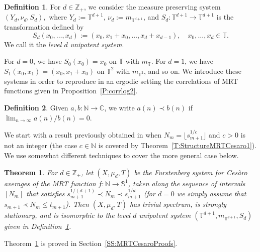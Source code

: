 \documentclass[11pt]{amsart}
\newtheorem{theorem}[lemma]{Theorem}
\theoremstyle{definition}
\newtheorem{definition}{Definition}[section]
\newcommand{\C}{{\mathbb C}}
\newcommand{\N}{{\mathbb N}}
\renewcommand{\S}{\mathbb{S}}
\newcommand{\T}{{\mathbb T}}
\newcommand{\Z}{{\mathbb Z}}
\begin{document}
 \begin{definition}\label{D:Sk}
	For  $d\in \Z_+$, we consider the measure preserving system
	$
	(Y_d,\nu_d,S_d),
	$
	where  $Y_d:=\T^{d+1}$, $\nu_d:=m_{\T^{d+1}}$,  and  $S_d\colon \T^{d+1}\to \T^{d+1}$ is the transformation defined by
	$$
	S_d(x_0,\ldots, x_d):=(x_0,x_1+x_0,\ldots, x_d+x_{d-1}), \quad x_0,\ldots, x_d\in \T.
	$$
	We call it the {\em level $d$ unipotent system}.
	\end{definition}
For $d=0$, we have $S_0(x_0)=x_0$ on $\T$ with $m_\T$. For $d=1$, we have
$S_1(x_0,x_1)=(x_0,x_1+x_0)$ on $\T^2$ with $m_{\T^2}$, and so on.
We introduce these systems in order to reproduce in an ergodic setting the correlations of MRT functions given in Proposition~\ref{P:corrlog2}.

\begin{definition}
Given  $a,b\colon \N\to \C$, we write $a(n)\prec b(n)$  if  $\lim_{n\to \infty} a(n)/b(n)=0$.
\end{definition}



We start with a result previously obtained in \cite{GLR21} when $N_m=\lfloor s_{m+1}^{1/c}\rfloor$ and $c>0$ is not an integer (the case $c\in \N$ is covered by Theorem~\ref{T:StructureMRTCesaro1}). We use somewhat different techniques to cover the more general case below. 
 \begin{theorem}\label{T:StructureMRTCesaro2}
	For $d\in \Z_+$, let  $(X,\mu_d,T)$ be the  Furstenberg system  for %
	Ces\`aro averages of the MRT function  $f\colon \N\to \S^1$, taken  along the sequence of intervals $[N_m]$ that satisfies $s_{m+1}^{1/(d+1)}\prec N_m\prec s_{m+1}^{1/d}$
	(for $d=0$ we simply assume that $s_{m+1}\prec N_m\leq t_{m+1}$). Then $(X,\mu_d,T)$  has trivial spectrum, is  strongly stationary,  and  is  isomorphic to the level $d$ unipotent system $(\T^{d+1},m_{\T^{d+1}},S_{d})$ given in   Definition~\ref{D:Sk}.
\end{theorem}
Theorem~\ref{T:StructureMRTCesaro2} is proved in Section~\ref{SS:MRTCesaroProofs}.
\end{document}
